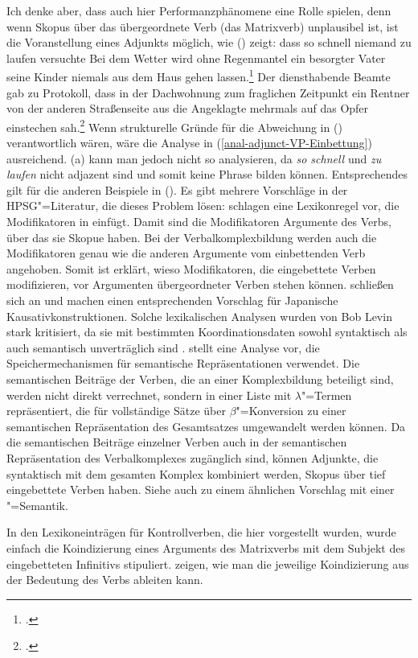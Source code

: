 {{Ich denke aber, dass auch hier Performanzphänomene eine Rolle spielen, denn wenn Skopus
über das übergeordnete Verb (das Matrixverb) unplausibel ist, ist die Voranstellung eines Adjunkts möglich, wie
() zeigt:
\eal
\ex dass so schnell niemand zu laufen versuchte
\ex Bei dem Wetter wird ohne Regenmantel ein besorgter Vater seine Kinder niemals aus dem Haus gehen lassen.\footnote{
.
}
\ex Der diensthabende Beamte gab zu Protokoll, dass in der Dachwohnung zum fraglichen Zeitpunkt ein Rentner von der
    anderen Straßenseite aus die Angeklagte mehrmals auf das Opfer einstechen sah.\footnote{
.
}
\zl
Wenn strukturelle Gründe für die Abweichung in () verantwortlich wären, wäre die Analyse in
(\ref{anal-adjunct-VP-Einbettung}) ausreichend. (a) kann man jedoch nicht so analysieren, da
\emph{so schnell} und \emph{zu laufen} nicht adjazent sind und somit keine Phrase bilden
können. Entsprechendes gilt für die anderen Beispiele in (). Es
gibt mehrere Vorschläge in der HPSG"=Literatur, die dieses Problem lösen: \citet{NB94} schlagen eine
Lexikonregel vor, die Modifikatoren in \compsln einfügt. Damit sind die Modifikatoren Argumente des
Verbs, über das sie Skopue haben. Bei der Verbalkomplexbildung werden auch die Modifikatoren genau wie die
anderen Argumente vom einbettenden Verb angehoben. Somit ist erklärt, wieso Modifikatoren, die
eingebettete Verben modifizieren, vor Argumenten übergeordneter Verben stehen können. \citet*{MSI99a}
schließen sich \citet{NB94} an und machen einen entsprechenden Vorschlag für
Japanische Kausativkonstruktionen. Solche lexikalischen
Analysen wurden von Bob Levin stark kritisiert, da sie mit bestimmten Koordinationsdaten sowohl
syntaktisch als auch semantisch unverträglich sind
\citep{Levine2003a,LH2006a}. \citet[Abschnitt~6]{Cipollone2001a} stellt eine Analyse vor, die
Speichermechanismen für semantische Repräsentationen verwendet. Die semantischen Beiträge der
Verben, die an einer Komplexbildung beteiligt sind, werden nicht direkt verrechnet, sondern in einer
Liste mit $\lambda$"=Termen repräsentiert, die für vollständige Sätze über $\beta$"=Konversion zu
einer semantischen Repräsentation des Gesamtsatzes umgewandelt werden können. Da die semantischen
Beiträge einzelner Verben auch in der semantischen Repräsentation des Verbalkomplexes zugänglich
sind, können Adjunkte, die syntaktisch mit dem gesamten Komplex kombiniert werden, Skopus über tief
eingebettete Verben haben. Siehe auch \citet{Crysmann2004a} zu einem ähnlichen Vorschlag mit einer \mrs"=Semantik.

In den Lexikoneinträgen für Kontrollverben, die hier vorgestellt wurden, wurde einfach die
Koindizierung eines Arguments des Matrixverbs mit dem Subjekt des eingebetteten Infinitivs
stipuliert. \citet[Kapitel~7]{ps2} zeigen, wie man die jeweilige Koindizierung aus der Bedeutung
des Verbs ableiten kann.
%
}%
}

